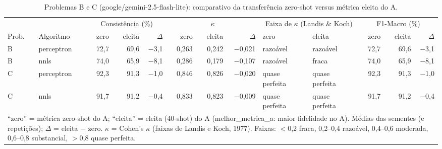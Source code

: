 \begin{table}[htbp]
\centering
\footnotesize
\caption{Problemas B e C (google/gemini-2.5-flash-lite): comparativo da transferência zero-shot versus métrica eleita do A.}
\label{tab:T9_comp_flashlite}
\begin{tabular}{llrrrrrrllrrr}
\toprule
 &  & \multicolumn{3}{c}{Consistência (\%)} & \multicolumn{3}{c}{$\kappa$} & \multicolumn{2}{c}{Faixa de $\kappa$ (Landis \& Koch)} & \multicolumn{3}{c}{F1-Macro (\%)} \\ \cmidrule(lr){3-5} \cmidrule(lr){6-8} \cmidrule(lr){9-10} \cmidrule(lr){11-13}
Prob. & Algoritmo & zero & eleita & $\Delta$ & zero & eleita & $\Delta$ & zero & eleita & zero & eleita & $\Delta$ \\
\midrule
B & perceptron & 72,7 & 69,6 & $-$3,1 & 0,263 & 0,242 & $-$0,021 & razoável & razoável & 72,7 & 69,6 & $-$3,1 \\
B & nnls & 74,0 & 65,9 & $-$8,1 & 0,286 & 0,179 & $-$0,107 & razoável & fraca & 74,0 & 65,9 & $-$8,1 \\
\midrule
C & perceptron & 92,3 & 91,3 & $-$1,0 & 0,846 & 0,826 & $-$0,020 & quase perfeita & quase perfeita & 92,3 & 91,3 & $-$1,0 \\
C & nnls & 91,7 & 91,2 & $-$0,4 & 0,833 & 0,823 & $-$0,009 & quase perfeita & quase perfeita & 91,7 & 91,2 & $-$0,4 \\
\bottomrule
\multicolumn{13}{p{0.95\linewidth}}{\footnotesize ``zero'' = métrica zero-shot do A; ``eleita'' = eleita (40-shot) do A (melhor\_metrica\_a: maior fidelidade no A). Médias das sementes (e repetições); $\Delta$ = eleita $-$ zero. $\kappa$ = Cohen's $\kappa$ (faixas de Landis e Koch, 1977). Faixas: $<$0,2 fraca, 0,2–0,4 razoável, 0,4–0,6 moderada, 0,6–0,8 substancial, $>$0,8 quase perfeita.} \\
\end{tabular}
\end{table}
